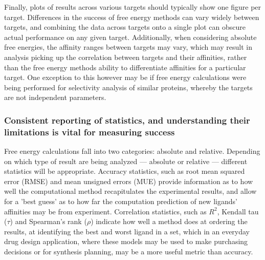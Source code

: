 \documentclass[9pt,bestpractices]{livecoms}
\begin{document}
Finally, plots of results across various targets should typically show one figure per target. Differences in the success of free energy methods can vary widely between targets, and combining the data across targets onto a single plot can obscure actual performance on any given target. Additionally, when considering absolute free energies, the affinity ranges between targets may vary, which may result in analysis picking up the correlation between targets and their affinities, rather than the free energy methods ability to differentiate affinities for a particular target. One exception to this however may be if free energy calculations were being performed for selectivity analysis of similar proteins, whereby the targets are not independent parameters\cite{aldeghiPredictionsLigandSelectivity2017}.

\subsubsection{Consistent reporting of statistics, and understanding their limitations is vital for measuring success}
\label{sec:statistical_analysis}
Free energy calculations fall into two categories: absolute and relative. Depending on which type of result are being analyzed --- absolute or relative --- different statistics will be appropriate. Accuracy statistics, such as root mean squared error (RMSE) and mean unsigned errors (MUE) provide information as to how well the computational method recapitulates the experimental results, and allow for a 'best guess' as to how far the computation prediction of new ligands' affinities may be from experiment. Correlation statistics, such as $R^{2}$, Kendall tau ($\tau$) and Spearman's rank ($\rho$) indicate how well a method does at ordering the results, at identifying the best and worst ligand in a set, which in an everyday drug design application, where these models may be used to make purchasing decisions or for synthesis planning, may be a more useful metric than accuracy.
\end{document}
